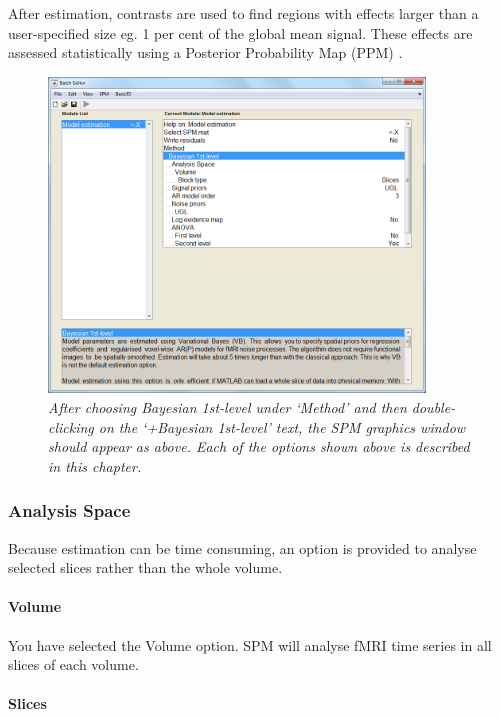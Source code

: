 After estimation, contrasts are used to find regions with effects larger than a user-specified size eg. 1 per cent of the global mean signal. These effects are assessed statistically using a Posterior Probability Map (PPM) \cite{karl_posterior}.

\begin{figure}
\begin{center}
\includegraphics[width=100mm]{fmri_est/bayes_options}
\end{center}
\caption{\em After choosing Bayesian 1st-level under `Method' and then double-clicking on the `+Bayesian 1st-level' text, the SPM graphics window should appear as above. Each of the options shown above is described in this chapter. \label{bayes_options}}
\end{figure}

\subsubsection{Analysis Space}

Because estimation can be time consuming, an option is provided to analyse selected slices rather than the whole volume.

\paragraph{Volume}

You have selected the Volume option. SPM will analyse fMRI time series in all slices of each volume.

\paragraph{Slices}

